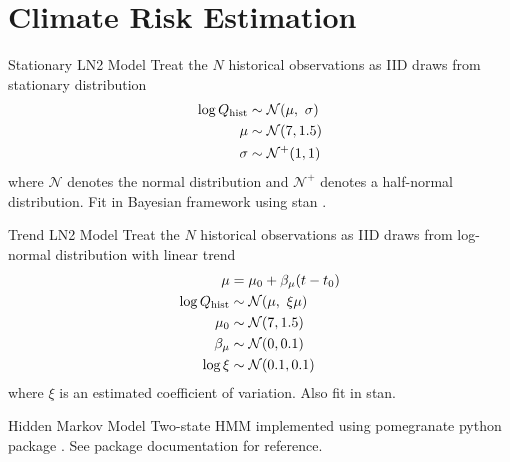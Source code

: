 \documentclass[
  10pt,     %
]{beamer}
\newcommand{\normal}{\mathcal{N}}
\begin{document}
\section{Climate Risk Estimation}

\begin{frame}{Stationary LN2 Model}
  Treat the $N$ historical observations as IID draws from stationary distribution
  \begin{align}\label{eq:ln2-stationary}
    \begin{split}
      \log Q_\text{hist} & \sim \normal \qty(\mu, \ \sigma) \\
      \mu &\sim \normal \qty(7, 1.5) \\
      \sigma &\sim \normal^+ \qty(1, 1)
    \end{split}
  \end{align}
  where $\normal$ denotes the normal distribution and $\normal^+$ denotes a half-normal distribution.
  Fit in Bayesian framework using stan \citep{Carpenter:2017ke}.
\end{frame}

\begin{frame}{Trend LN2 Model}
  Treat the $N$ historical observations as IID draws from log-normal distribution with linear trend
  \begin{align}\label{eq:ln2-trend}
    \begin{split}
      \mu &= \mu_0 + \beta_\mu \qty(t - t_0) \\
    \log Q_\text{hist} & \sim \normal \qty(\mu, \ \xi \mu) \\
    \mu_0 & \sim \normal \qty(7, 1.5) \\
    \beta_\mu & \sim \normal \qty(0, 0.1) \\
    \log \xi & \sim \normal \qty(0.1, 0.1)
    \end{split}
  \end{align}
  where $\xi$ is an estimated coefficient of variation.
  Also fit in stan.
\end{frame}

\begin{frame}{Hidden Markov Model}
  Two-state HMM \citep[see][]{Rabiner:1986jk} implemented using pomegranate python package \citep{Schreiber:2017tg}.
  See package documentation for reference.
\end{frame}
\end{document}
